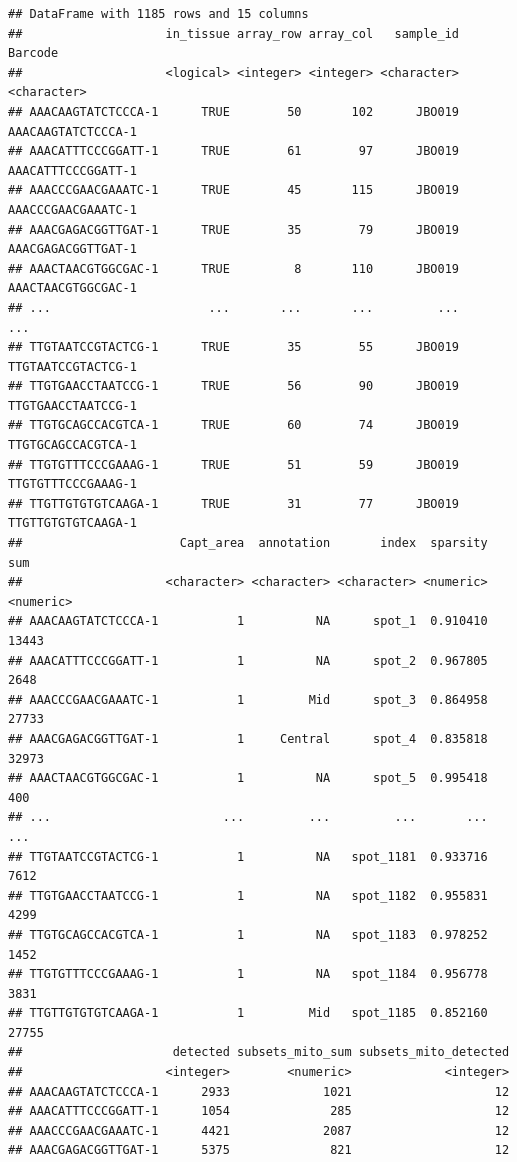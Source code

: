 \documentclass[
]{book}
\begin{document}
\begin{verbatim}
## DataFrame with 1185 rows and 15 columns
##                    in_tissue array_row array_col   sample_id            Barcode
##                    <logical> <integer> <integer> <character>        <character>
## AAACAAGTATCTCCCA-1      TRUE        50       102      JBO019 AAACAAGTATCTCCCA-1
## AAACATTTCCCGGATT-1      TRUE        61        97      JBO019 AAACATTTCCCGGATT-1
## AAACCCGAACGAAATC-1      TRUE        45       115      JBO019 AAACCCGAACGAAATC-1
## AAACGAGACGGTTGAT-1      TRUE        35        79      JBO019 AAACGAGACGGTTGAT-1
## AAACTAACGTGGCGAC-1      TRUE         8       110      JBO019 AAACTAACGTGGCGAC-1
## ...                      ...       ...       ...         ...                ...
## TTGTAATCCGTACTCG-1      TRUE        35        55      JBO019 TTGTAATCCGTACTCG-1
## TTGTGAACCTAATCCG-1      TRUE        56        90      JBO019 TTGTGAACCTAATCCG-1
## TTGTGCAGCCACGTCA-1      TRUE        60        74      JBO019 TTGTGCAGCCACGTCA-1
## TTGTGTTTCCCGAAAG-1      TRUE        51        59      JBO019 TTGTGTTTCCCGAAAG-1
## TTGTTGTGTGTCAAGA-1      TRUE        31        77      JBO019 TTGTTGTGTGTCAAGA-1
##                      Capt_area  annotation       index  sparsity       sum
##                    <character> <character> <character> <numeric> <numeric>
## AAACAAGTATCTCCCA-1           1          NA      spot_1  0.910410     13443
## AAACATTTCCCGGATT-1           1          NA      spot_2  0.967805      2648
## AAACCCGAACGAAATC-1           1         Mid      spot_3  0.864958     27733
## AAACGAGACGGTTGAT-1           1     Central      spot_4  0.835818     32973
## AAACTAACGTGGCGAC-1           1          NA      spot_5  0.995418       400
## ...                        ...         ...         ...       ...       ...
## TTGTAATCCGTACTCG-1           1          NA   spot_1181  0.933716      7612
## TTGTGAACCTAATCCG-1           1          NA   spot_1182  0.955831      4299
## TTGTGCAGCCACGTCA-1           1          NA   spot_1183  0.978252      1452
## TTGTGTTTCCCGAAAG-1           1          NA   spot_1184  0.956778      3831
## TTGTTGTGTGTCAAGA-1           1         Mid   spot_1185  0.852160     27755
##                     detected subsets_mito_sum subsets_mito_detected
##                    <integer>        <numeric>             <integer>
## AAACAAGTATCTCCCA-1      2933             1021                    12
## AAACATTTCCCGGATT-1      1054              285                    12
## AAACCCGAACGAAATC-1      4421             2087                    12
## AAACGAGACGGTTGAT-1      5375              821                    12

\end{verbatim}
\end{document}

